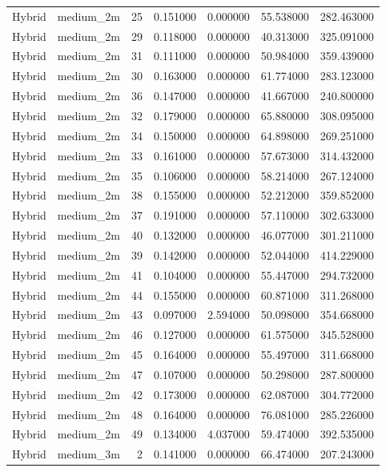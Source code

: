 \begin{tabular}{llrrrrr}
Hybrid & medium_2m & 25 & 0.151000 & 0.000000 & 55.538000 & 282.463000 \\
Hybrid & medium_2m & 29 & 0.118000 & 0.000000 & 40.313000 & 325.091000 \\
Hybrid & medium_2m & 31 & 0.111000 & 0.000000 & 50.984000 & 359.439000 \\
Hybrid & medium_2m & 30 & 0.163000 & 0.000000 & 61.774000 & 283.123000 \\
Hybrid & medium_2m & 36 & 0.147000 & 0.000000 & 41.667000 & 240.800000 \\
Hybrid & medium_2m & 32 & 0.179000 & 0.000000 & 65.880000 & 308.095000 \\
Hybrid & medium_2m & 34 & 0.150000 & 0.000000 & 64.898000 & 269.251000 \\
Hybrid & medium_2m & 33 & 0.161000 & 0.000000 & 57.673000 & 314.432000 \\
Hybrid & medium_2m & 35 & 0.106000 & 0.000000 & 58.214000 & 267.124000 \\
Hybrid & medium_2m & 38 & 0.155000 & 0.000000 & 52.212000 & 359.852000 \\
Hybrid & medium_2m & 37 & 0.191000 & 0.000000 & 57.110000 & 302.633000 \\
Hybrid & medium_2m & 40 & 0.132000 & 0.000000 & 46.077000 & 301.211000 \\
Hybrid & medium_2m & 39 & 0.142000 & 0.000000 & 52.044000 & 414.229000 \\
Hybrid & medium_2m & 41 & 0.104000 & 0.000000 & 55.447000 & 294.732000 \\
Hybrid & medium_2m & 44 & 0.155000 & 0.000000 & 60.871000 & 311.268000 \\
Hybrid & medium_2m & 43 & 0.097000 & 2.594000 & 50.098000 & 354.668000 \\
Hybrid & medium_2m & 46 & 0.127000 & 0.000000 & 61.575000 & 345.528000 \\
Hybrid & medium_2m & 45 & 0.164000 & 0.000000 & 55.497000 & 311.668000 \\
Hybrid & medium_2m & 47 & 0.107000 & 0.000000 & 50.298000 & 287.800000 \\
Hybrid & medium_2m & 42 & 0.173000 & 0.000000 & 62.087000 & 304.772000 \\
Hybrid & medium_2m & 48 & 0.164000 & 0.000000 & 76.081000 & 285.226000 \\
Hybrid & medium_2m & 49 & 0.134000 & 4.037000 & 59.474000 & 392.535000 \\
Hybrid & medium_3m & 2 & 0.141000 & 0.000000 & 66.474000 & 207.243000 \\

\end{tabular}
